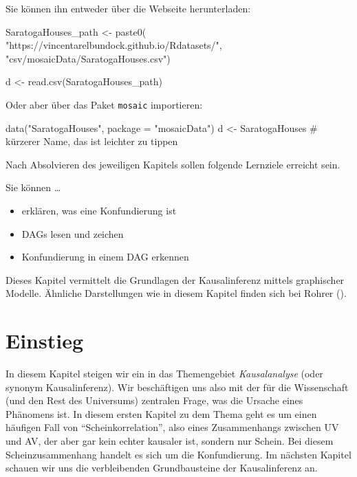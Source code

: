 \documentclass[
  ngerman,
  letterpaper,
  twoside,
  open=any]{scrbook}
\newenvironment{Shaded}{\begin{snugshade}}{\end{snugshade}}
\newcommand{\AttributeTok}[1]{\textcolor[rgb]{0.40,0.45,0.13}{#1}}
\newcommand{\CommentTok}[1]{\textcolor[rgb]{0.37,0.37,0.37}{#1}}
\newcommand{\FunctionTok}[1]{\textcolor[rgb]{0.28,0.35,0.67}{#1}}
\newcommand{\NormalTok}[1]{\textcolor[rgb]{0.00,0.23,0.31}{#1}}
\newcommand{\OtherTok}[1]{\textcolor[rgb]{0.00,0.23,0.31}{#1}}
\newcommand{\StringTok}[1]{\textcolor[rgb]{0.13,0.47,0.30}{#1}}
\providecommand{\tightlist}{%
  \setlength{\itemsep}{0pt}\setlength{\parskip}{0pt}}\usepackage{longtable,booktabs,array}
\theoremstyle{definition}
\theoremstyle{plain}
\theoremstyle{definition}
\theoremstyle{definition}
\theoremstyle{definition}
\theoremstyle{definition}
\theoremstyle{remark}
\begin{document}
Sie können ihn entweder über die Webseite herunterladen:

\begin{Shaded}
\begin{Highlighting}[]
\NormalTok{SaratogaHouses\_path }\OtherTok{\textless{}{-}} \FunctionTok{paste0}\NormalTok{(}
  \StringTok{"https://vincentarelbundock.github.io/Rdatasets/"}\NormalTok{,}
  \StringTok{"csv/mosaicData/SaratogaHouses.csv"}\NormalTok{)}
  
\NormalTok{d }\OtherTok{\textless{}{-}} \FunctionTok{read.csv}\NormalTok{(SaratogaHouses\_path)}
\end{Highlighting}
\end{Shaded}

Oder aber über das Paket \texttt{mosaic} importieren:

\begin{Shaded}
\begin{Highlighting}[]
\FunctionTok{data}\NormalTok{(}\StringTok{"SaratogaHouses"}\NormalTok{, }\AttributeTok{package =} \StringTok{"mosaicData"}\NormalTok{)}
\NormalTok{d }\OtherTok{\textless{}{-}}\NormalTok{ SaratogaHouses  }\CommentTok{\# kürzerer Name, das ist leichter zu tippen}
\end{Highlighting}
\end{Shaded}

Nach Absolvieren des jeweiligen Kapitels sollen folgende Lernziele
erreicht sein.

Sie können \ldots{}

\begin{itemize}
\tightlist
\item
  erklären, was eine Konfundierung ist
\item
  DAGs lesen und zeichen
\item
  Konfundierung in einem DAG erkennen
\end{itemize}

Dieses Kapitel vermittelt die Grundlagen der Kausalinferenz mittels
graphischer Modelle. Ähnliche Darstellungen wie in diesem Kapitel finden
sich bei Rohrer ().

\section{Einstieg}\label{einstieg-3}

In diesem Kapitel steigen wir ein in das Themengebiet
\emph{Kausalanalyse} (oder synonym Kausalinferenz). Wir beschäftigen uns
also mit der für die Wissenschaft (und den Rest des Universums)
zentralen Frage, was die Ursache eines Phänomens ist. In diesem ersten
Kapitel zu dem Thema geht es um einen häufigen Fall von
\enquote{Scheinkorrelation}, also eines Zusammenhangs zwischen UV und
AV, der aber gar kein echter kausaler ist, sondern nur Schein. Bei
diesem Scheinzusammenhang handelt es sich um die Konfundierung. Im
nächsten Kapitel schauen wir uns die verbleibenden Grundbausteine der
Kausalinferenz an.
\end{document}
